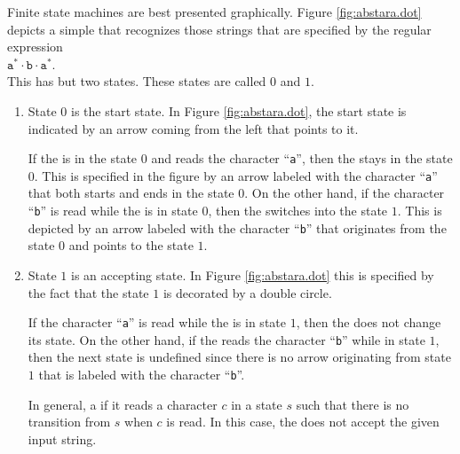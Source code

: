 \noindent
Finite state machines are best presented graphically.  Figure \ref{fig:abstara.dot} depicts a simple
 that recognizes those strings that are specified by the regular expression
\\[0.2cm]
\hspace*{1.3cm}
$\texttt{a}^*\cdot\texttt{b}\cdot\texttt{a}^*$.
\\[0.2cm]
This  has but two states.  These states are called $0$ and $1$.
\begin{enumerate}
\item State $0$  is the start state.  In Figure \ref{fig:abstara.dot}, the start state is indicated by an arrow
      coming from the left that points to it.  
  
      If the  is in the state $0$ and reads the character ``\texttt{a}'', then the
       stays in the state $0$.  This is specified in the figure by an arrow labeled with the
      character ``\texttt{a}'' that both starts and ends in the state $0$.  On the other hand, if the
      character ``\texttt{b}'' is read while the  is in state 0, then the 
      switches into the state $1$.  This is depicted by an arrow labeled with the character
      ``\texttt{b}'' that originates from the state $0$ and points to the state $1$.
\item State  $1$ is an accepting state. In Figure \ref{fig:abstara.dot} this is specified by the
      fact that the state $1$ is decorated by a double circle.

      If the character ``\texttt{a}'' is read while the  is in state $1$, then the
       does not change its state.  On the other hand, if the  reads the
      character ``\texttt{b}'' while in state $1$, then the next state is undefined since there is no
      arrow originating from state $1$ that is labeled with the character ``\texttt{b}''.

      In general, a   
      if it reads a character $c$ in a state $s$ such that there is no transition from $s$ when $c$ is read.
      In this case, the  does not accept the given input string.
\end{enumerate}

